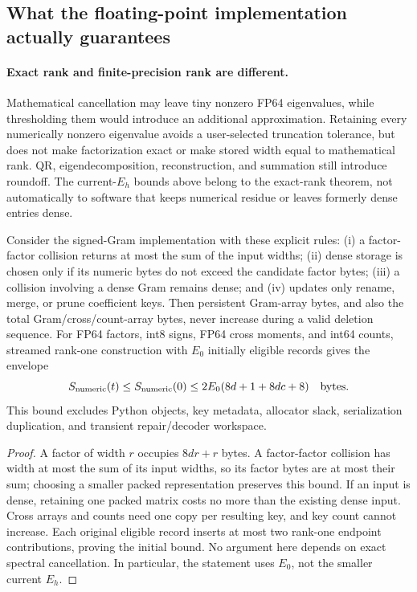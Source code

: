 \subsection{What the floating-point implementation actually guarantees}
\paragraph{Exact rank and finite-precision rank are different.}
Mathematical cancellation may leave tiny nonzero FP64 eigenvalues, while
thresholding them would introduce an additional approximation. Retaining
every numerically nonzero eigenvalue avoids a user-selected truncation
tolerance, but does not make factorization exact or make stored width equal
to mathematical rank. QR, eigendecomposition, reconstruction, and summation
still introduce roundoff. The current-$E_h$ bounds above belong to the
exact-rank theorem, not automatically to software that keeps numerical
residue or leaves formerly dense entries dense.

\begin{proposition}
Consider the signed-Gram implementation with these explicit rules:
(i) a factor-factor collision returns at most the sum of the input widths;
(ii) dense storage is chosen only if its numeric bytes do not exceed the
candidate factor bytes; (iii) a collision involving a dense Gram remains
dense; and (iv) updates only rename, merge, or prune coefficient keys.
Then persistent Gram-array bytes, and also the total Gram/cross/count-array
bytes, never increase during a valid deletion sequence. For FP64 factors,
int8 signs, FP64 cross moments, and int64 counts, streamed rank-one
construction with $E_0$ initially eligible records gives the envelope
\[
 S_{\rm numeric}(t)\le S_{\rm numeric}(0)
       \le 2E_0(8d+1+8dc+8)\quad\text{bytes}.
\]
This bound excludes Python objects, key metadata, allocator slack,
serialization duplication, and transient repair/decoder workspace.
\end{proposition}
\begin{proof}
A factor of width $r$ occupies $8dr+r$ bytes. A factor-factor collision has
width at most the sum of its input widths, so its factor bytes are at most
their sum; choosing a smaller packed representation preserves this bound.
If an input is dense, retaining one packed matrix costs no more than the
existing dense input. Cross arrays and counts need one copy per resulting
key, and key count cannot increase. Each original eligible record inserts
at most two rank-one endpoint contributions, proving the initial bound.
No argument here depends on exact spectral cancellation. In particular,
the statement uses $E_0$, not the smaller current $E_h$.
\end{proof}

